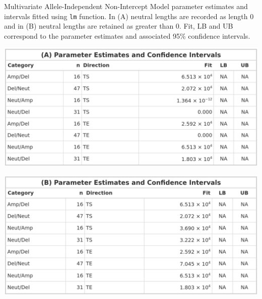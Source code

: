 \begin{table}[H]
    \caption[Multivariate Allele-Independent Non-Intercept Model parameter estimates and intervals fitted using \texttt{lm} function.]{Multivariate Allele-Independent Non-Intercept Model parameter estimates and intervals fitted using \texttt{lm} function. In (A) neutral lengths are recorded as length 0 and in (B) neutral lengths are retained as greater than 0. Fit, LB and UB correspond to the parameter estimates and associated 95\% confidence intervals. }
    \label{tbl:lm_multi_2_pred}
     \begin{subtable}[t]{.49\textwidth}
      \centering
      \includegraphics[width = 1\textwidth]{../tables/Chapter_5/Multivariate_lm_6_AI_Pred.png}
    \end{subtable}%
    \hspace{0.5cm}
     \begin{subtable}[t]{.49\textwidth}
      \centering
         \includegraphics[width = 1\textwidth]{../tables/Chapter_5/Multivariate_lm_6_Neut_AI_Pred.png}
    \end{subtable} 
\end{table}

